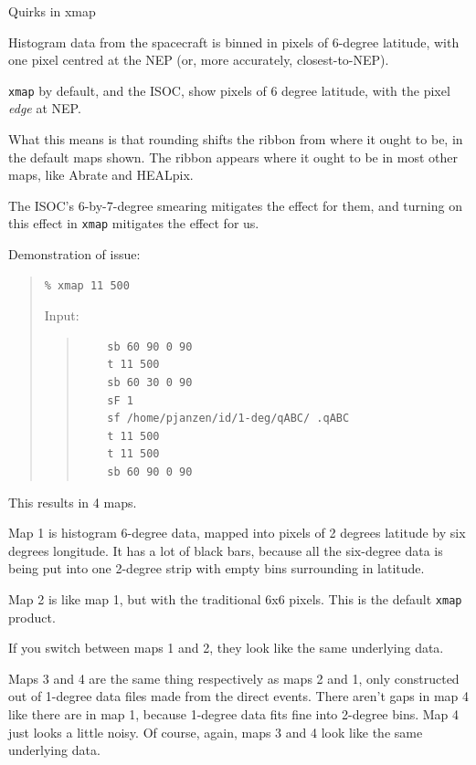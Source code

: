 \documentclass[10pt]{article}
\begin{document}
\begin{center}
{\large{\sc Quirks in xmap}}
\end{center}

Histogram data from the spacecraft is binned in pixels of 6-degree
latitude, with one pixel centred at the NEP (or, more accurately,
closest-to-NEP).

\texttt{xmap} by default, and the ISOC, show pixels of 6 degree latitude,
with the pixel \emph{edge} at NEP.

What this means is that rounding shifts the ribbon from where it ought to
be, in the default maps shown.  The ribbon appears where it ought to be in
most other maps, like Abrate and HEALpix.

The ISOC's 6-by-7-degree smearing mitigates the effect for them, and
turning on this effect in \texttt{xmap} mitigates the effect for us.


Demonstration of issue:
\begin{quotation}
\vspace{-5mm}
\noindent \begin{verbatim}
% xmap 11 500
\end{verbatim}
Input:
\begin{quotation}
\noindent \begin{verbatim}
	sb 60 90 0 90
	t 11 500
	sb 60 30 0 90
	sF 1
	sf /home/pjanzen/id/1-deg/qABC/ .qABC
	t 11 500
	t 11 500
	sb 60 90 0 90
\end{verbatim}
\end{quotation}
\end{quotation}

This results in 4 maps.

Map 1 is histogram 6-degree data, mapped into pixels of 2 degrees latitude
by six degrees longitude.  It has a lot of black bars, because all the
six-degree data is being put into one 2-degree strip with empty bins
surrounding in latitude.

Map 2 is like map 1, but with the traditional 6x6 pixels.  This is the
default \texttt{xmap} product.

If you switch between maps 1 and 2, they look like the same underlying
data.

Maps 3 and 4 are the same thing respectively as maps 2 and 1, only
constructed out of 1-degree data files made from the direct events.
There aren't gaps in map 4 like there are in map 1, because 1-degree data
fits fine into 2-degree bins.  Map 4 just looks a little noisy.  Of course,
again, maps 3 and 4 look like the same underlying data.
\end{document}
